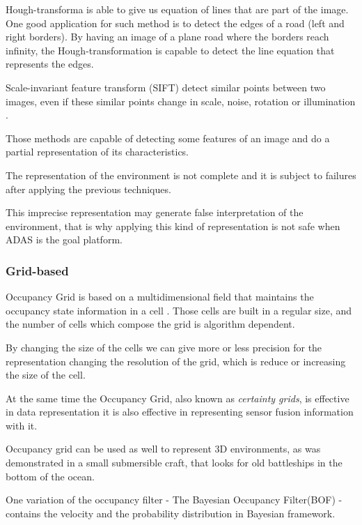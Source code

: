 Hough-transforma is able to give us equation of lines that are part of the image. One good application for such method is to detect the edges of a road (left and right borders). By having an image of a plane road where the borders reach infinity, the Hough-transformation is capable to detect the line equation that represents the edges. \cite{Ballard:1987:GHT:33517.33574}

Scale-invariant feature transform (SIFT) detect similar points between two images, even if these similar points change in scale, noise, rotation or illumination \cite{Lowe:1999:ORL:850924.851523}.

Those methods are capable of detecting some features of an image and do a partial representation of its characteristics. 

The representation of the environment is not complete and it is subject to failures after applying the previous techniques.

This imprecise representation may generate false interpretation of the environment, that is why applying this kind of representation is not safe when ADAS is the goal platform.

\subsubsection{Grid-based}
\label{ch02:gridbased}

Occupancy Grid is based on a multidimensional field that maintains the occupancy state information in a cell \cite{Elfes:1989:UOG:68491.68495}. Those cells are built in a regular size, and the number of cells which compose the grid is algorithm dependent.

By changing the size of the cells we can give more or less precision for the representation changing the resolution of the grid, which is reduce or increasing the size of the cell.

At the same time the Occupancy Grid, also known as \textit{certainty grids}, is effective in data representation it is also effective in representing sensor fusion information with it. 

Occupancy grid can be used as well to represent 3D environments, as was demonstrated in a small submersible craft, that looks for old battleships in the bottom of the ocean\cite{DBLP:journals/aim/Moravec88}.

One variation of the occupancy filter - The Bayesian Occupancy Filter(BOF) - contains the velocity and the probability distribution in Bayesian framework.

